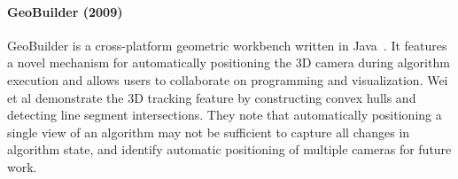 






\paragraph{GeoBuilder (2009)}

GeoBuilder is a cross-platform geometric workbench written in
Java~\cite{wei2009geobuilder}. It features a novel mechanism for automatically
positioning the 3D camera during algorithm execution and allows users to
collaborate on programming and visualization. Wei et al demonstrate the 3D
tracking feature by constructing convex hulls and detecting line segment
intersections. They note that automatically positioning a single view of an
algorithm may not be sufficient to capture all changes in algorithm state, and
identify automatic positioning of multiple cameras for future work.

